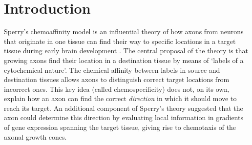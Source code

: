 \documentclass[11pt, a4paper]{article}
\begin{document}

\section{Introduction}


Sperry's chemoaffinity model is an influential theory of how axons from neurons that originate in one tissue can find their way to specific locations in a target tissue during early brain development \citep{sperry_reestablishment_1942,sperry_visuomotor_1943,sperry_chemoaffinity_1963}.
%
The central proposal of the theory is that growing axons find their location in a destination tissue by means of `labels of a cytochemical nature'.
The chemical affinity between labels in source and destination tissues allows axons to distinguish correct target locations from incorrect ones.
%
This key idea (called chemospecificity) does not, on its own, explain how an axon can find the correct \emph{direction} in which it should move to reach its target.
An additional component of Sperry's theory \citep{stevens_handbook_1950,sperry_problems_1955,sperry_chemoaffinity_1963} suggested that the axon could determine this direction by evaluating local information in gradients of gene expression spanning the target tissue, giving rise to chemotaxis of the axonal growth cones.
\end{document}
